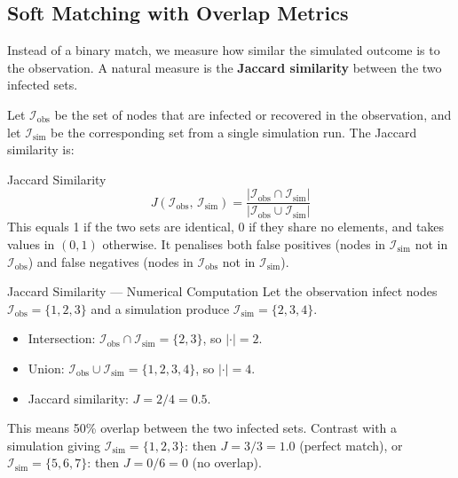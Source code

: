\subsection{Soft Matching with Overlap Metrics}

Instead of a binary match, we measure how similar the simulated outcome is to
the observation. A natural measure is the \textbf{Jaccard similarity} between
the two infected sets.

Let $\mathcal{I}_{\text{obs}}$ be the set of nodes that are infected or
recovered in the observation, and let $\mathcal{I}_{\text{sim}}$ be the
corresponding set from a single simulation run. The Jaccard similarity is:

\begin{mathbox}{Jaccard Similarity}
\begin{equation}
    J(\mathcal{I}_{\text{obs}},\, \mathcal{I}_{\text{sim}})
    = \frac{|\mathcal{I}_{\text{obs}} \cap \mathcal{I}_{\text{sim}}|}
           {|\mathcal{I}_{\text{obs}} \cup \mathcal{I}_{\text{sim}}|}
    \label{eq:jaccard}
\end{equation}
This equals 1 if the two sets are identical, 0 if they share no elements,
and takes values in $(0, 1)$ otherwise. It penalises both false positives
(nodes in $\mathcal{I}_{\text{sim}}$ not in $\mathcal{I}_{\text{obs}}$) and
false negatives (nodes in $\mathcal{I}_{\text{obs}}$ not in
$\mathcal{I}_{\text{sim}}$).
\end{mathbox}

\begin{examplebox}{Jaccard Similarity — Numerical Computation}
Let the observation infect nodes $\mathcal{I}_{\text{obs}} = \{1, 2, 3\}$
and a simulation produce $\mathcal{I}_{\text{sim}} = \{2, 3, 4\}$.

\begin{itemize}
    \item Intersection: $\mathcal{I}_{\text{obs}} \cap \mathcal{I}_{\text{sim}}
    = \{2, 3\}$, so $|\cdot| = 2$.
    \item Union: $\mathcal{I}_{\text{obs}} \cup \mathcal{I}_{\text{sim}}
    = \{1, 2, 3, 4\}$, so $|\cdot| = 4$.
    \item Jaccard similarity: $J = 2 / 4 = 0.5$.
\end{itemize}

This means 50\% overlap between the two infected sets. Contrast with a
simulation giving $\mathcal{I}_{\text{sim}} = \{1, 2, 3\}$: then
$J = 3/3 = 1.0$ (perfect match), or
$\mathcal{I}_{\text{sim}} = \{5, 6, 7\}$: then $J = 0/6 = 0$ (no overlap).
\end{examplebox}

